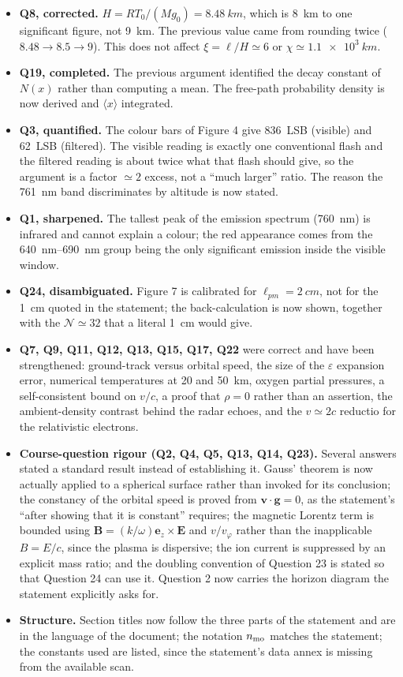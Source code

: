 \documentclass[11pt,a4paper]{article}
\newcommand{\E}{\mathbf{E}}
\newcommand{\B}{\mathbf{B}}
\begin{document}
\begin{itemize}[nosep]
\item \textbf{Q8, corrected.} $H=RT_0/(Mg_0)=\SI{8.48}{km}$, which is \SI{8}{km}
to one significant figure, not \SI{9}{km}. The previous value came from rounding
twice ($8.48\to8.5\to9$). This does not affect $\xi=\ell/H\simeq6$ or
$\chi\simeq\SI{1.1e3}{km}$.
\item \textbf{Q19, completed.} The previous argument identified the decay
constant of $N(x)$ rather than computing a mean. The free-path probability
density is now derived and $\langle x\rangle$ integrated.
\item \textbf{Q3, quantified.} The colour bars of Figure 4 give 836~LSB
(visible) and 62~LSB (filtered). The visible reading is exactly one conventional
flash and the filtered reading is about twice what that flash should give, so the
argument is a factor $\simeq2$ excess, not a ``much larger'' ratio. The reason the
\SI{761}{nm} band discriminates by altitude is now stated.
\item \textbf{Q1, sharpened.} The tallest peak of the emission spectrum
(\SI{760}{nm}) is infrared and cannot explain a colour; the red appearance comes
from the \SIrange{640}{690}{nm} group being the only significant emission inside
the visible window.
\item \textbf{Q24, disambiguated.} Figure 7 is calibrated for
$\ell_{pm}=\SI{2}{cm}$, not for the \SI{1}{cm} quoted in the statement; the
back-calculation is now shown, together with the $\mathcal{N}\simeq32$ that a
literal \SI{1}{cm} would give.
\item \textbf{Q7, Q9, Q11, Q12, Q13, Q15, Q17, Q22} were correct and have been
strengthened: ground-track versus orbital speed, the size of the $\varepsilon$
expansion error, numerical temperatures at 20 and \SI{50}{km}, oxygen partial
pressures, a self-consistent bound on $v/c$, a proof that $\rho=0$ rather than an
assertion, the ambient-density contrast behind the radar echoes, and the
$v\simeq2c$ reductio for the relativistic electrons.
\item \textbf{Course-question rigour (Q2, Q4, Q5, Q13, Q14, Q23).} Several
answers stated a standard result instead of establishing it. Gauss' theorem is
now actually applied to a spherical surface rather than invoked for its
conclusion; the constancy of the orbital speed is proved from
$\mathbf v\cdot\mathbf g=0$, as the statement's ``after showing that it is
constant'' requires; the magnetic Lorentz term is bounded using
$\B=(k/\omega)\mathbf e_z\times\E$ and $v/v_\varphi$ rather than the
inapplicable $B=E/c$, since the plasma is dispersive; the ion current is
suppressed by an explicit mass ratio; and the doubling convention of Question 23
is stated so that Question 24 can use it. Question 2 now carries the horizon
diagram the statement explicitly asks for.
\item \textbf{Structure.} Section titles now follow the three parts of the
statement and are in the language of the document; the notation $n_{\rm mo}$
matches the statement; the constants used are listed, since the statement's data
annex is missing from the available scan.
\end{itemize}
\end{document}
